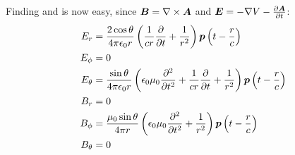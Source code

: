     Finding \B{} and \E{} is now easy, since $\bm{B} = \nabla\times\bm{A}$ and $\bm{E} = -\nabla V - \frac{\partial\bm{A}}{\partial t}$:
    \begin{align}
        E_r &= \frac{2\cos\theta}{4\pi\epsilon_0 r}\left(\frac{1}{cr}\frac{\partial}{\partial t} + \frac{1}{r^2}\right)
                \bm{p}\left(t - \frac{{r}}{c}\right)\\
        E_\phi &= 0 \\
        E_\theta &= \frac{\sin\theta}{4\pi\epsilon_0 r}\left(\epsilon_0\mu_0\frac{\partial^2}{\partial t^2} 
                + \frac{1}{cr}\frac{\partial}{\partial t} + \frac{1}{r^2}\right)
                \bm{p}\left(t - \frac{{r}}{c}\right)\\
        B_r &= 0 \\
        B_\phi &= \frac{\mu_0 \sin\theta}{4\pi r}\left(\epsilon_0\mu_0\frac{\partial^2}{\partial t^2} + \frac{1}{r^2}\right)
                \bm{p}\left(t - \frac{{r}}{c}\right)\\
        B_\theta &= 0
    \end{align}